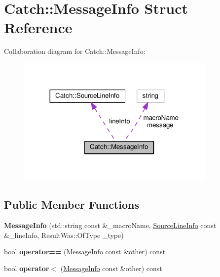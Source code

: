 \hypertarget{structCatch_1_1MessageInfo}{}\section{Catch\+:\+:Message\+Info Struct Reference}
\label{structCatch_1_1MessageInfo}


Collaboration diagram for Catch\+:\+:Message\+Info\+:\nopagebreak
\begin{figure}[H]
\begin{center}
\leavevmode
\includegraphics[width=276pt]{structCatch_1_1MessageInfo__coll__graph}
\end{center}
\end{figure}
\subsection*{Public Member Functions}
\begin{DoxyCompactItemize}
\item 
{\bfseries Message\+Info} (std\+::string const \&\+\_\+macro\+Name, \hyperlink{structCatch_1_1SourceLineInfo}{Source\+Line\+Info} const \&\+\_\+line\+Info, Result\+Was\+::\+Of\+Type \+\_\+type)\hypertarget{structCatch_1_1MessageInfo_a2e336c33ebef7af3c1bbae6a56e14f8a}{}\label{structCatch_1_1MessageInfo_a2e336c33ebef7af3c1bbae6a56e14f8a}

\item 
bool {\bfseries operator==} (\hyperlink{structCatch_1_1MessageInfo}{Message\+Info} const \&other) const \hypertarget{structCatch_1_1MessageInfo_a30fe117138e568c5a9dfdabb7de6e790}{}\label{structCatch_1_1MessageInfo_a30fe117138e568c5a9dfdabb7de6e790}

\item 
bool {\bfseries operator$<$} (\hyperlink{structCatch_1_1MessageInfo}{Message\+Info} const \&other) const \hypertarget{structCatch_1_1MessageInfo_a7a2b1ec3772cd35176e2ee25a94be16a}{}\label{structCatch_1_1MessageInfo_a7a2b1ec3772cd35176e2ee25a94be16a}

\end{DoxyCompactItemize}
